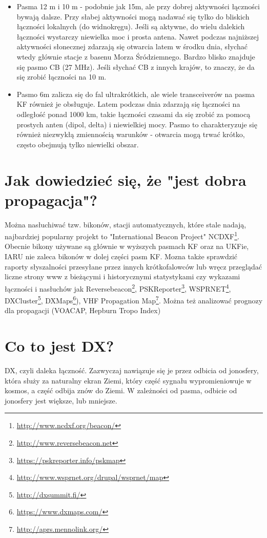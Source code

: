 \documentclass[a4paper,12pt]{article}
\begin{document}
\begin{itemize}
 \item Pasma 12 m i 10 m - podobnie jak 15m, ale przy dobrej aktywności łączności bywają dalsze. Przy słabej aktywności mogą nadawać się tylko do bliskich łączności lokalnych (do widnokręgu). Jeśli są aktywne, do wielu dalekich łączności wystarczy niewielka moc i prosta antena. Nawet podczas najniższej aktywności słonecznej zdarzają się otwarcia latem w środku dnia, słychać wtedy głównie stacje z basenu Morza Śródziemnego. Bardzo blisko znajduje się pasmo CB (27 MHz). Jeśli słychać CB z innych krajów, to znaczy, że da się zrobić łączności na 10 m.
 \item Pasmo 6m zalicza się do fal ultrakrótkich, ale wiele transceiverów na pasma KF również je obsługuje. Latem podczas dnia zdarzają się łączności na odległość ponad 1000 km, takie łączności czasami da się zrobić za pomocą prostych anten (dipol, delta) i niewielkiej mocy. Pasmo to charakteryzuje się również niezwykłą zmiennością warunków - otwarcia mogą trwać krótko, często obejmują tylko niewielki obszar.
\end{itemize}

\section{Jak dowiedzieć się, że "jest dobra propagacja"?}

Można nasłuchiwać tzw. bikonów, stacji automatycznych, które stale nadają, najbardziej popularny projekt to "International Beacon Project" NCDXF\footnote{\url{http://www.ncdxf.org/beacon/}}. Obecnie bikony używane są głównie w wyższych pasmach KF oraz na UKFie, IARU nie zaleca bikonów w dolej części pasm KF. Mozna także sprawdzić raporty słyszalności przesyłane przez innych krótkofalowców lub wręcz przeglądać liczne strony www z bieżącymi i historycznymi statystykami czy wykazami łączności i nasłuchów jak Reversebeacon\footnote{\url{http://www.reversebeacon.net}}, PSKReporter\footnote{\url{https://pskreporter.info/pskmap}}, WSPRNET\footnote{\url{http://www.wsprnet.org/drupal/wsprnet/map}}, DXCluster\footnote{\url{http://dxsummit.fi/}}, DXMaps\footnote{\url{https://www.dxmaps.com/}}), VHF Propagation Map\footnote{\url{http://aprs.mennolink.org/}}. Można też analizować prognozy dla propagacji (VOACAP, Hepburn Tropo Index)


\section{Co to jest DX?}
DX, czyli daleka łączność. Zazwyczaj nawiązuje się je przez odbicia od jonosfery, która służy za naturalny ekran Ziemi, który część sygnału wypromieniowuje w kosmos, a część odbija znów do Ziemi. W zależności od pasma, odbicie od jonosfery jest większe, lub mniejsze.
\end{document}
